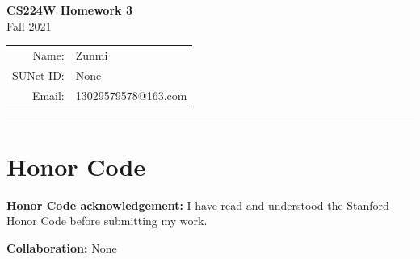\documentclass[11pt]{article}
\makeatletter
\newcommand{\studentname}{Zunmi}
\newcommand{\studentid}{None}
\newcommand{\studentemail}{13029579578@163.com}
\newcommand{\collaborators}{None}
\makeatother
\begin{document}
\begin{center}
  {\Large\bfseries CS224W Homework 3}\\[0.5em]
  {\large Fall 2021}\\[1em]
  \begin{tabular}{rl}
    Name: & \studentname \\
    SUNet ID: & \studentid \\
    Email: & \studentemail
  \end{tabular}
\end{center}

\vspace{0.75em}
\hrule
\vspace{1em}




\clearpage
\section*{Honor Code}

\noindent
\textbf{Honor Code acknowledgement:}
I have read and understood the Stanford Honor Code before submitting my work.

\noindent
\textbf{Collaboration:} \collaborators
\end{document}
